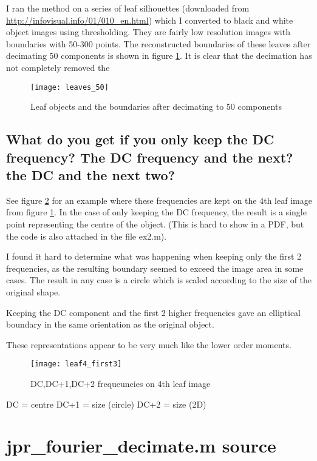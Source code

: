 \documentclass[a4paper]{article}
\begin{document}
I ran the method on a series of leaf silhouettes (downloaded from \url{http://infovisual.info/01/010_en.html}) which I converted to black and white object images using thresholding. They are fairly low resolution images with boundaries with 50-300 points. The reconstructed boundaries of these leaves after decimating 50 components is shown in figure \ref{fig1}. It is clear that the decimation has not completely removed the 
         \begin{figure}
                 \centering
                 \texttt{[image: leaves\_50]}
                 \caption{Leaf objects and the boundaries after decimating to 50 components}
                 \label{fig1}
         \end{figure}


\subsection*{What do you get if you only keep the DC frequency? The DC frequency and the next? the DC and the next two?}
See figure \ref{fig2} for an example where these frequencies are kept on the 4th leaf image from figure \ref{fig1}.
In the case of only keeping the DC frequency, the result is a single point representing the centre of the object. (This is hard to show in a PDF, but the code is also attached in the file ex2.m).

I found it hard to determine what was happening when keeping only the first 2 frequencies, as the resulting boundary seemed to exceed the image area in some cases. The result in any case is a circle which is scaled according to the size of the original shape.

Keeping the DC component and the first 2 higher frequencies gave an elliptical boundary in the same orientation as the original object.

These representations appear to be very much like the lower order moments.
         \begin{figure}
                 \centering
                 \texttt{[image: leaf4\_first3]}
                 \caption{DC,DC+1,DC+2 frequeuncies on 4th leaf image}
                 \label{fig2}
         \end{figure}


DC = centre 
DC+1 = size (circle)
DC+2 = size (2D) 
\clearpage
 \appendix 
\section{jpr\_fourier\_decimate.m source}
\label{appendix-decimate} 

\end{document}
